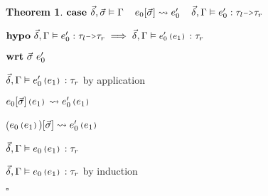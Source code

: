 \documentclass[acmsmall]{acmart}
\theoremstyle{definition}
\newtheorem{theorem}{Theorem}[section]
\begin{document}
\begin{theorem}
    \item \Z $\B{case }
      \vec{\delta}, \vec{\sigma} \satisfies \Gamma
      \I
      e_0[\vec{\sigma}] \rightsquigarrow e_0'
      \I
      \vec{\delta}, \Gamma \satisfies e_0' \hastype \tau_l \J{->} \tau_r
    $
    \item \Z $\B{hypo}\ 
      \vec{\delta}, \Gamma \satisfies e_0' \hastype \tau_l \J{->} \tau_r
      \implies
      \vec{\delta}, \Gamma \satisfies \J{$e_0'$($e_1$)} \hastype \tau_r
    $
    \item \Z $ 
    \textbf{wrt}\ \vec{\sigma}\ e_0' 
    $
      \item \Z\Z $\vec{\delta}, \Gamma \satisfies e_0'\J{(}e_1\J{)} \hastype \tau_r$ by application 
      \item \Z\Z $e_0[\vec{\sigma}]\J{(}e_1\J{)} \rightsquigarrow e_0'\J{(}e_1\J{)}$
      \item \Z\Z ($e_0\J{(}e_1\J{)})[\vec{\sigma}] \rightsquigarrow e_0'\J{(}e_1\J{)}$
      \item \Z\Z $\vec{\delta}, \Gamma \satisfies e_0\J{(}e_1\J{)} \hastype \tau_r$ 

    \item \Z $\vec{\delta}, \Gamma \satisfies e_0\J{(}e_1\J{)} \hastype \tau_r$ by induction
  \item $\square$
\end{theorem}
\end{document}
